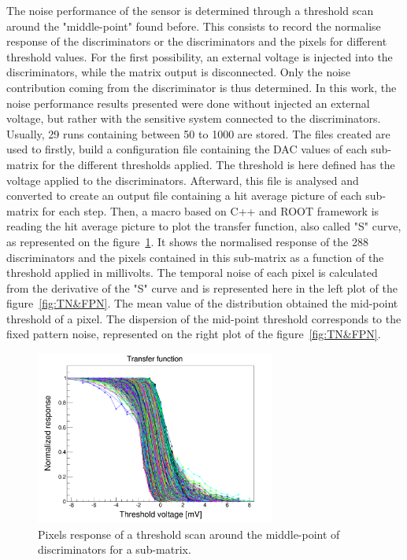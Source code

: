   The noise performance of the sensor is determined through a threshold scan around the "middle-point" found before.
  This consists to record the normalise response of the discriminators or the discriminators and the pixels for different threshold values.
  For the first possibility, an external voltage is injected into the discriminators, while the matrix output is disconnected.
  Only the noise contribution coming from the discriminator is thus determined.
  In this work, the noise performance results presented were done without injected an external voltage, but rather with the sensitive system connected to the discriminators.
  Usually, 29 runs containing between 50 to 1000 are stored.
  The files created are used to firstly, build a configuration file containing the DAC values of each sub-matrix for the different thresholds applied.
  The threshold is here defined has the voltage applied to the discriminators.
  Afterward, this file is analysed and converted to create an output file containing a hit average picture of each sub-matrix for each step.
  Then, a macro based on C++ and ROOT framework is reading the hit average picture to plot the transfer function, also called "S" curve, as represented on the figure~\ref{fig:transfer}.
  It shows the normalised response of the 288 discriminators and the pixels contained in this sub-matrix as a function of the threshold applied in millivolts.
  The temporal noise of each pixel is calculated from the derivative of the "S" curve and is represented here in the left plot of the figure~\ref{fig:TN&FPN}.
  The mean value of the distribution obtained the mid-point threshold of a pixel.
  The dispersion of the mid-point threshold corresponds to the fixed pattern noise, represented on the right plot of the figure~\ref{fig:TN&FPN}.
  
  \begin{figure}[!h]
    \centering
    \includegraphics[width=0.7\textwidth]{Pictures/labTests/transfer_B.png}
    \caption{Pixels response of a threshold scan around the middle-point of discriminators for a sub-matrix.}
    \label{fig:transfer}
  \end{figure}

